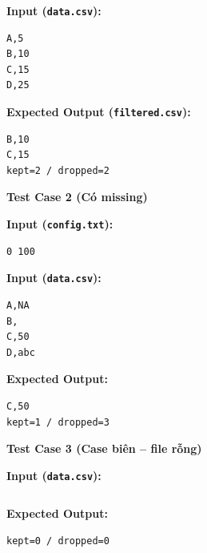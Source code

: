 \textbf{Input (\texttt{data.csv}):}
\begin{lstlisting}
A,5
B,10
C,15
D,25
\end{lstlisting}

\textbf{Expected Output (\texttt{filtered.csv}):}
\begin{lstlisting}
B,10
C,15
kept=2 / dropped=2
\end{lstlisting}

\vspace{0.5cm}

\textbf{Test Case 2 (Có missing)}

\textbf{Input (\texttt{config.txt}):}
\begin{lstlisting}
0 100
\end{lstlisting}

\textbf{Input (\texttt{data.csv}):}
\begin{lstlisting}
A,NA
B,
C,50
D,abc
\end{lstlisting}

\textbf{Expected Output:}
\begin{lstlisting}
C,50
kept=1 / dropped=3
\end{lstlisting}

\vspace{0.5cm}

\textbf{Test Case 3 (Case biên -- file rỗng)}

\textbf{Input (\texttt{data.csv}):}
\begin{lstlisting}
\end{lstlisting}

\textbf{Expected Output:}
\begin{lstlisting}
kept=0 / dropped=0
\end{lstlisting}